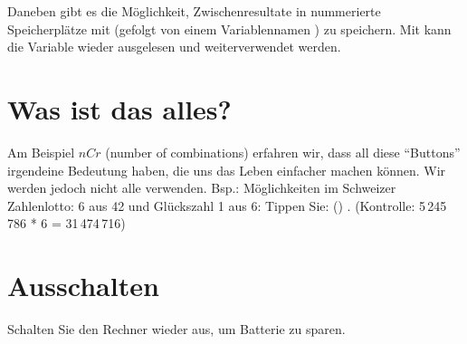 Daneben gibt es die Möglichkeit, Zwischenresultate in nummerierte
Speicherplätze mit  (gefolgt von einem
Variablennamen ) zu
speichern. Mit   kann die Variable wieder
ausgelesen und weiterverwendet werden.

\section{Was ist das alles?}
Am Beispiel $nCr$ (number of combinations) erfahren wir, dass all
diese ``Buttons'' irgendeine Bedeutung haben, die uns das Leben
einfacher machen können. Wir werden jedoch nicht alle verwenden.
Bsp.: Möglichkeiten im Schweizer Zahlenlotto: 6
aus 42 und Glückszahl 1 aus 6:
Tippen Sie: ()   
  
. (Kontrolle: 5\,245\,786 * 6 = 31\,474\,716)

\section{Ausschalten}
Schalten Sie den Rechner wieder aus, um Batterie zu sparen.



